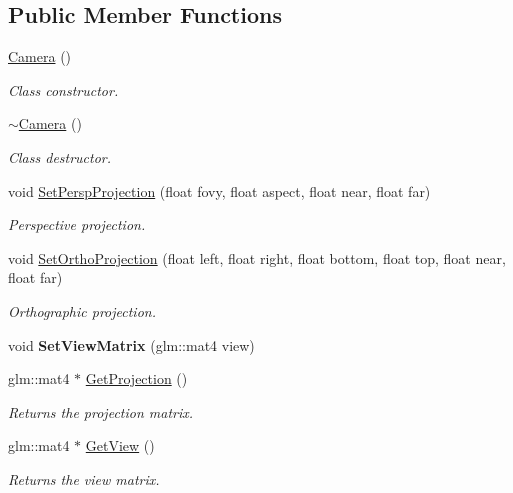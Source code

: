 \subsection*{Public Member Functions}
\begin{DoxyCompactItemize}
\item 
\hyperlink{class_camera_a01f94c3543f56ede7af49dc778f19331}{Camera} ()
\begin{DoxyCompactList}\small\item\em Class constructor. \end{DoxyCompactList}\item 
\hyperlink{class_camera_ad1897942d0ccf91052386388a497349f}{$\sim$\+Camera} ()
\begin{DoxyCompactList}\small\item\em Class destructor. \end{DoxyCompactList}\item 
void \hyperlink{class_camera_ab8bb3c4e5dd304753fc6a2937175d1d9}{Set\+Persp\+Projection} (float fovy, float aspect, float near, float far)
\begin{DoxyCompactList}\small\item\em Perspective projection. \end{DoxyCompactList}\item 
void \hyperlink{class_camera_aaee3d9ca2a77a31574da1e927047af84}{Set\+Ortho\+Projection} (float left, float right, float bottom, float top, float near, float far)
\begin{DoxyCompactList}\small\item\em Orthographic projection. \end{DoxyCompactList}\item 
\hypertarget{class_camera_aaeadc93f9c5800d2b52af7f88c3ede5a}{}void {\bfseries Set\+View\+Matrix} (glm\+::mat4 view)\label{class_camera_aaeadc93f9c5800d2b52af7f88c3ede5a}

\item 
glm\+::mat4 $\ast$ \hyperlink{class_camera_a0a515e9b67a4f4f9d012209431e45448}{Get\+Projection} ()
\begin{DoxyCompactList}\small\item\em Returns the projection matrix. \end{DoxyCompactList}\item 
glm\+::mat4 $\ast$ \hyperlink{class_camera_a7a1951025a21533f97f06071df681f7b}{Get\+View} ()
\begin{DoxyCompactList}\small\item\em Returns the view matrix. \end{DoxyCompactList}\end{DoxyCompactItemize}
